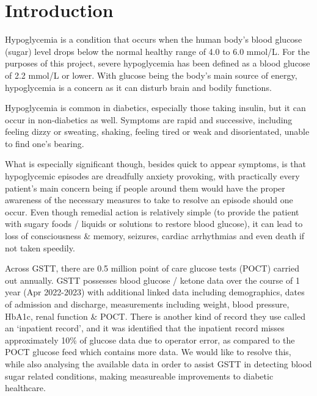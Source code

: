 \section{Introduction}

\begin{flushleft}
Hypoglycemia is a condition that occurs when the human body’s blood glucose (sugar) level drops below the normal healthy range of 4.0 to 6.0 mmol/L. For the purposes of this project, severe hypoglycemia has been defined as a blood glucose of 2.2 mmol/L or lower. With glucose being the body’s main source of energy, hypoglycemia is a concern as it can disturb brain and bodily functions.  \\ \vspace{5pt}

Hypoglycemia is common in diabetics, especially those taking insulin, but it can occur in non-diabetics as well. Symptoms are rapid and successive, including feeling dizzy or sweating, shaking, feeling tired or weak and disorientated, unable to find one's bearing. \\ \vspace{5pt}

What is especially significant though, besides quick to appear symptoms, is that hypoglycemic episodes are dreadfully anxiety provoking, with practically every patient's main concern being if people around them would have the proper awareness of the necessary measures to take to resolve an episode should one occur. Even though remedial action is relatively simple (to provide the patient with sugary foods / liquids or solutions to restore blood glucose), it can lead to loss of consciousness \& memory, seizures, cardiac arrhythmias and even death if not taken speedily.    \\ \vspace{5pt}

Across GSTT, there are 0.5 million point of care glucose tests (POCT) carried out annually. GSTT possesses blood glucose / ketone data over the course of 1 year (Apr 2022-2023) with additional linked data including demographics, dates of admission and discharge, 
measurements including weight, blood pressure, HbA1c, renal function \& POCT. There is another kind of record they use called an ‘inpatient record’, and it was identified that the inpatient record misses approximately 10\% of glucose data due to operator error, as compared to the POCT glucose feed which contains more data. We would like to resolve this, while also analysing the available data in order to assist GSTT in detecting blood sugar related conditions, making measureable improvements to diabetic healthcare. \\ \vspace{5pt}


\end{flushleft}
